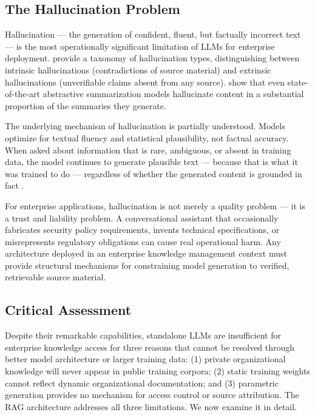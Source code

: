 \subsection{The Hallucination Problem}

Hallucination — the generation of confident, fluent, but factually incorrect text — is the most operationally significant limitation of LLMs for enterprise deployment. \citet{Ji2023} provide a taxonomy of hallucination types, distinguishing between intrinsic hallucinations (contradictions of source material) and extrinsic hallucinations (unverifiable claims absent from any source). \citet{Maynez2020} show that even state-of-the-art abstractive summarization models hallucinate content in a substantial proportion of the summaries they generate.

The underlying mechanism of hallucination is partially understood. Models optimize for textual fluency and statistical plausibility, not factual accuracy. When asked about information that is rare, ambiguous, or absent in training data, the model continues to generate plausible text — because that is what it was trained to do — regardless of whether the generated content is grounded in fact \citep{Rawte2023}.

For enterprise applications, hallucination is not merely a quality problem — it is a trust and liability problem. A conversational assistant that occasionally fabricates security policy requirements, invents technical specifications, or misrepresents regulatory obligations can cause real operational harm. Any architecture deployed in an enterprise knowledge management context must provide structural mechanisms for constraining model generation to verified, retrievable source material.

\subsection{Critical Assessment}

Despite their remarkable capabilities, standalone LLMs are insufficient for enterprise knowledge access for three reasons that cannot be resolved through better model architecture or larger training data: (1) private organizational knowledge will never appear in public training corpora; (2) static training weights cannot reflect dynamic organizational documentation; and (3) parametric generation provides no mechanism for access control or source attribution. The RAG architecture addresses all three limitations. We now examine it in detail.

